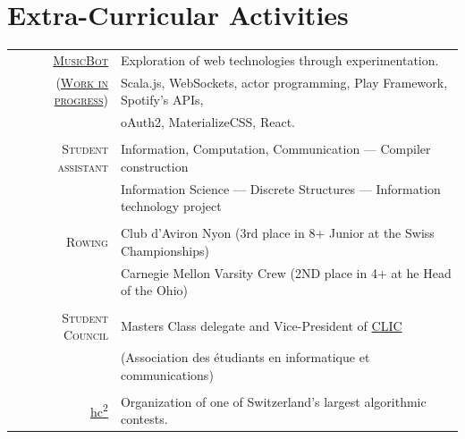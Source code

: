\documentclass[a4paper,11pt]{article} %
\begin{document}
\section{Extra-Curricular Activities}
\begin{tabular}{rl}

\textsc{\large{\href{https://github.com/paullepoulpe/musicbot}{MusicBot}}} &
Exploration of web technologies through experimentation. \\

\textsc{\large{ (\href{https://musicbot.ch}{Work in progress}) }} &
Scala.js, WebSockets, actor programming, Play Framework, Spotify's APIs, \\
& oAuth2, MaterializeCSS, React.\\
\multicolumn{2}{c}{} \\

\textsc{\large{Student assistant}} &
Information, Computation, Communication ---
Compiler construction\\
& Information Science --- Discrete Structures ---
Information technology project \\
\multicolumn{2}{c}{} \\

\textsc{\large{Rowing}} &
Club d'Aviron Nyon (3rd place in 8+ Junior at the Swiss Championships)\\
& Carnegie Mellon Varsity Crew (2ND place in 4+ at he Head of the Ohio)\\
\multicolumn{2}{c}{} \\

\textsc{\large{Student Council}} &
Masters Class delegate and Vice-President of
\href{http://clic.epfl.ch/}{CLIC}\\
& (Association des étudiants en informatique et communications)\\
\multicolumn{2}{c}{} \\

\large{\href{http://hc2.ch/}{hc\textsuperscript{2}}} & Organization of one of
Switzerland's largest algorithmic contests.\\
\end{tabular}


\end{document}
